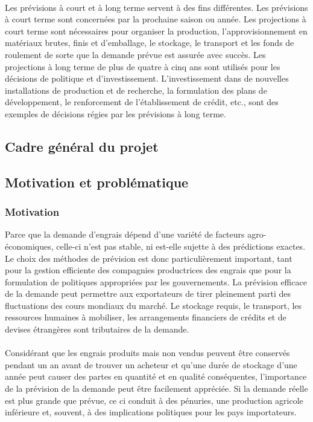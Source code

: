 	\paragraph*{}
	Les prévisions à court et à long terme servent à des fins différentes. Les prévisions à court terme sont concernées par la prochaine saison ou année. Les projections à court terme sont nécessaires pour organiser la production, l'approvisionnement en matériaux brutes, finis et d'emballage, le stockage, le transport et les fonds de roulement de sorte que la demande prévue est assurée avec succès. Les projections à long terme de plus de quatre à cinq ans sont utilisés pour les décisions de politique et d'investissement. L'investissement dans de nouvelles installations de production et de recherche, la formulation des plans de développement, le renforcement de l'établissement de crédit, etc., sont des exemples de décisions régies par les prévisions à long terme.
	\subsection{Cadre général du projet}
	
	\subsection{Motivation et problématique}
	\subsubsection{Motivation}
	Parce que la demande d'engrais dépend d'une variété de facteurs agro-économiques, celle-ci n’est pas stable, ni est-elle sujette à des prédictions exactes. Le choix des méthodes de prévision est donc particulièrement important, tant pour la gestion efficiente des compagnies productrices des engrais que pour la formulation de politiques appropriées par les gouvernements.
	La prévision efficace de la demande peut permettre aux exportateurs de tirer pleinement parti des fluctuations des cours mondiaux du marché. Le stockage requis, le transport, les ressources humaines à mobiliser, les arrangements financiers de crédits et de devises étrangères sont tributaires de la demande.
	\paragraph{}
	Considérant que les engrais produits mais non vendus peuvent être conservés pendant un an avant de trouver un acheteur et qu'une durée de stockage d'une année peut causer des partes en quantité et en qualité conséquentes, l'importance de la prévision de la demande peut être facilement appréciée. Si la demande réelle est plus grande que prévue, ce ci conduit à des pénuries, une production agricole inférieure et, souvent, à des implications politiques pour les pays importateurs.
